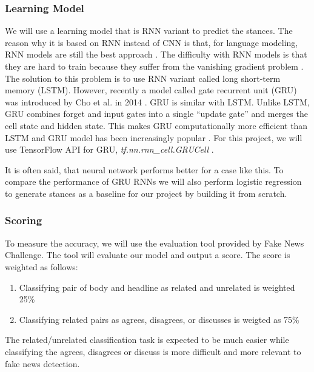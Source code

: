 \documentclass[12pt]{article}
\begin{document}
\subsubsection{Learning Model}

We will use a learning model that is  RNN variant to predict the stances. 
The reason why it is based on RNN instead of CNN is that, for language 
modeling, RNN models are still the best approach \cite{MikolovDKBC11}. 
The difficulty with RNN models is that they are hard to train because they 
suffer from the vanishing gradient problem \cite{Murphy:2012:MLP:2380985}. 
The solution to this problem is to use RNN variant called long short-term memory
(LSTM). However, recently a model called gate recurrent unit (GRU) was 
introduced by Cho et al. in 2014 \cite{DBLP:journals/corr/ChoMGBSB14}. GRU is similar with LSTM. Unlike LSTM, GRU 
combines forget and input gates into a single “update gate” and merges the cell
state and hidden state. This makes GRU computationally more efficient than 
LSTM and GRU model has been increasingly popular \cite{DBLP:journals/corr/Rana16a}. For this project, we will use 
TensorFlow API for GRU, \textit{tf.nn.rnn\_cell.GRUCell} \cite{tensorflow2015-whitepaper}. 

It is often said, that neural network performs better for a case like this.
To compare the performance of GRU RNNs we will also perform logistic regression
to generate stances as a baseline for our project by building it from scratch.

\subsubsection{Scoring}
To measure the accuracy, we will use the evaluation tool provided by 
Fake News Challenge. The tool will evaluate our model and output a score. 
The score is weighted as follows:
\begin{enumerate}
    \item Classifying pair of body and headline as related and unrelated is 
      weighted 25\%
    \item Classifying related pairs as agrees, disagrees, or discusses is 
      weigted as 75\%
\end{enumerate}
The related/unrelated classification task is expected to be much easier while classifying the agrees, disagrees or discuss 
is more difficult and more relevant to fake news detection.



\end{document}
